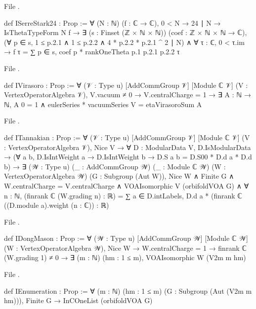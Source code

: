 \noindent File .
\begin{leancode}
def ISerreStark24 : Prop :=
  ∀ (N : ℕ) (f : ℂ → ℂ), 0 < N → 24 ∣ N → IsThetaTypeForm N f →
    ∃ (s : Finset (ℤ × ℕ × ℕ)) (coef : ℤ × ℕ × ℕ → ℂ),
      (∀ p ∈ s, 1 ≤ p.2.1 ∧ 1 ≤ p.2.2 ∧ 4 * p.2.2 * p.2.1 ^ 2 ∣ N) ∧
      ∀ τ : ℂ, 0 < τ.im → f τ = ∑ p ∈ s, coef p * rankOneTheta p.1 p.2.1 p.2.2 τ
\end{leancode}
\noindent File .
\begin{leancode}
def IVirasoro : Prop :=
  ∀ (𝒱 : Type u) [AddCommGroup 𝒱] [Module ℂ 𝒱] (V : VertexOperatorAlgebra 𝒱),
    V.vacuum ≠ 0 → V.centralCharge = 1 →
      ∃ A : ℕ → ℕ, A 0 = 1 ∧ eulerSeries * vacuumSeries V = etaVirasoroSum A
\end{leancode}
\noindent File .
\begin{leancode}
def ITannakian : Prop :=
  ∀ (𝒱 : Type u) [AddCommGroup 𝒱] [Module ℂ 𝒱] (V : VertexOperatorAlgebra 𝒱), Nice V →
    ∀ D : ModularData V, D.IsModularData →
    (∀ a b, D.IsIntWeight a → D.IsIntWeight b → D.S a b = D.S00 * D.d a * D.d b) →
    ∃ (𝒲 : Type u) (_ : AddCommGroup 𝒲) (_ : Module ℂ 𝒲) (W : VertexOperatorAlgebra 𝒲)
      (G : Subgroup (Aut W)), Nice W ∧ Finite G ∧ W.centralCharge = V.centralCharge ∧
      VOAIsomorphic V (orbifoldVOA G) ∧
      ∀ n : ℕ, (finrank ℂ (W.grading n) : ℝ) =
        ∑ a ∈ D.intLabels, D.d a * (finrank ℂ ((D.module a).weight (n : ℂ)) : ℝ)
\end{leancode}
\noindent File .
\begin{leancode}
def IDongMason : Prop :=
  ∀ (𝒲 : Type u) [AddCommGroup 𝒲] [Module ℂ 𝒲] (W : VertexOperatorAlgebra 𝒲), Nice W →
    W.centralCharge = 1 → finrank ℂ (W.grading 1) ≠ 0 →
      ∃ (m : ℕ) (hm : 1 ≤ m), VOAIsomorphic W (V2m m hm)
\end{leancode}
\noindent File .
\begin{leancode}
def IEnumeration : Prop :=
  ∀ (m : ℕ) (hm : 1 ≤ m) (G : Subgroup (Aut (V2m m hm))), Finite G →
    InCOneList (orbifoldVOA G)
\end{leancode}

